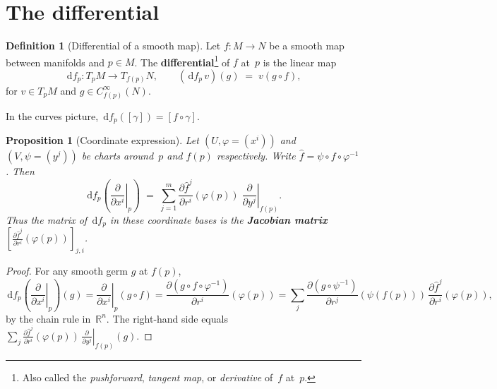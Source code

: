 \documentclass[12pt,a4paper,openany]{book}
\newtheorem{proposition}[theorem]{Proposition}
\theoremstyle{definition}
\newtheorem{definition}[theorem]{Definition}
\theoremstyle{remark}
\newcommand{\R}{\mathbb{R}}
\newcommand{\dd}{\,\mathrm{d}}
\begin{document}
\section{The differential}\label{sec:differential}

\begin{definition}[Differential of a smooth map]\label{def:differential}%
Let $f \colon M \to N$ be a smooth map between manifolds and $p \in M$.
The \textbf{differential}\footnote{Also called the \emph{pushforward},
\emph{tangent map}, or \emph{derivative} of~$f$ at~$p$.} of $f$ at~$p$
is the linear map
\[
  \dd f_p \colon T_pM \longrightarrow T_{f(p)}N,
  \qquad
  (\dd f_p\, v)(g) \;=\; v(g \circ f),
\]
for $v \in T_pM$ and $g \in C^\infty_{f(p)}(N)$.
\end{definition}

In the curves picture, $\dd f_p([\gamma]) = [f \circ \gamma]$.

\begin{proposition}[Coordinate expression]\label{prop:diff-coords}%
Let $(U, \varphi = (x^i))$ and $(V, \psi = (y^j))$ be charts around~$p$
and $f(p)$ respectively.  Write $\hat{f} = \psi \circ f \circ \varphi^{-1}$.
Then
\[
  \dd f_p\!\left(\left.\frac{\partial}{\partial x^i}\right|_p\right)
  \;=\; \sum_{j=1}^m
  \frac{\partial \hat{f}^j}{\partial r^i}(\varphi(p))\;
  \left.\frac{\partial}{\partial y^j}\right|_{f(p)}.
\]
Thus the matrix of $\dd f_p$ in these coordinate bases is the
\textbf{Jacobian matrix}
$\left[\frac{\partial \hat{f}^j}{\partial r^i}(\varphi(p))\right]_{j,i}$.
\end{proposition}

\begin{proof}
For any smooth germ $g$ at $f(p)$,
\[
  \dd f_p\!\left(\left.\frac{\partial}{\partial x^i}\right|_p\right)(g)
  = \left.\frac{\partial}{\partial x^i}\right|_p(g \circ f)
  = \frac{\partial (g \circ f \circ \varphi^{-1})}{\partial r^i}(\varphi(p))
  = \sum_j \frac{\partial (g \circ \psi^{-1})}{\partial r^j}(\psi(f(p)))\,
    \frac{\partial \hat{f}^j}{\partial r^i}(\varphi(p)),
\]
by the chain rule in~$\R^n$.  The right-hand side equals
$\sum_j \frac{\partial \hat{f}^j}{\partial r^i}(\varphi(p))\,
\left.\frac{\partial}{\partial y^j}\right|_{f(p)}(g)$.
\end{proof}
\end{document}
